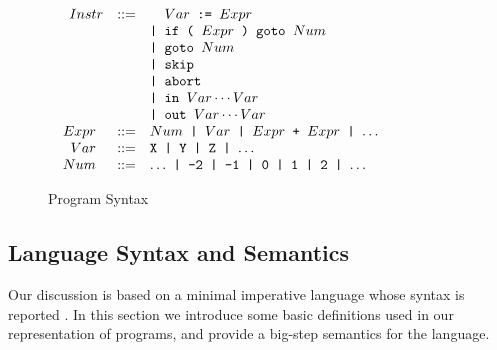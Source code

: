 
\begin{figure}[b]
\vspace{-2mm}
\centering
\begin{minipage}{0.63\textwidth}
\noindent
\begin{small}
$
\begin{array}{rcl}
\texttt{$Instr$} & ::= & \hphantom{\texttt{| }}\texttt{$Var$ := $Expr$} \\
& & \texttt{| if ( $Expr$ ) goto $Num$} \\
& & \texttt{| goto $Num$} \\
& & \texttt{| skip} \\
& & \texttt{| abort} \\
& & \texttt{| in $Var\cdots Var$} \\ 
& & \texttt{| out $Var\cdots Var$} \\
\texttt{ $Expr$ } & ::= & \texttt{$Num$ | $Var$ | $Expr$ + $Expr$ | $\ldots$ } \\
\texttt{ $Var$ } & ::= & \texttt{X | Y | Z | $\ldots$} \\
\texttt{ $Num$ } & ::= & \texttt{$\ldots$ | -2 | -1 | 0 | 1 | 2 | $\ldots$} \\
\end{array}
$
\end{small}
\end{minipage}
\caption{\label{fig:osr-program-syntax}Program Syntax}
\end{figure}

\subsection{Language Syntax and Semantics}
\label{ss:osr-language-framework}
Our discussion is based on a minimal imperative language whose syntax is reported . In this section we introduce some basic definitions used in our representation of programs, and provide a big-step semantics for the language.


